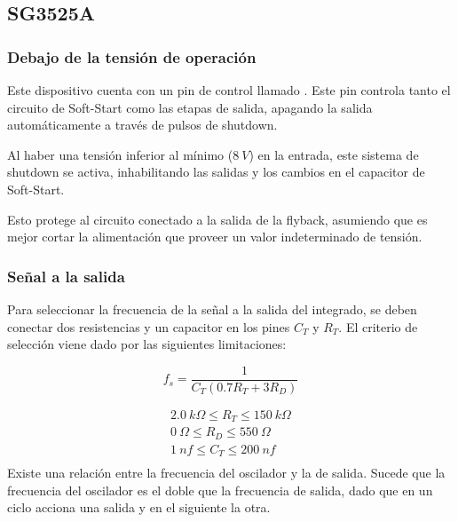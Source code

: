 %
%
%

\subsection{SG3525A}

\subsubsection{Debajo de la tensión de operación}

Este dispositivo cuenta con un pin de control llamado . Este pin controla tanto el circuito de Soft-Start como las etapas de salida, apagando la salida automáticamente a través de pulsos de shutdown.

Al haber una tensión inferior al mínimo ($8 \ V$) en la entrada, este sistema de shutdown se activa, inhabilitando las salidas y los cambios en el capacitor de Soft-Start.

Esto protege al circuito conectado a la salida de la flyback, asumiendo que es mejor cortar la alimentación que proveer un valor indeterminado de tensión.

\subsubsection{Señal a la salida}

Para seleccionar la frecuencia de la señal a la salida del integrado, se deben conectar dos resistencias y un capacitor en los pines $C_T$ y $R_T$. El criterio de selección viene dado por las siguientes limitaciones:

\begin{equation}
	f_s = \frac{1}{C_T \left( 0.7 R_T + 3 R_D \right)}
\end{equation}

\begin{equation*}
\begin{gathered}
2.0 \ k\Omega \leqslant R_T \leqslant 150 \ k\Omega \\
0 \ \Omega \leqslant R_D \leqslant 550 \ \Omega \\
1 \ nf \leqslant C_T \leqslant 200 \ nf \\
\end{gathered}
\end{equation*}
Existe una relación entre la frecuencia del oscilador y la de salida.
 Sucede que la frecuencia del oscilador es el doble que la frecuencia de salida, dado que en un ciclo acciona una salida y en el siguiente la otra.\\

